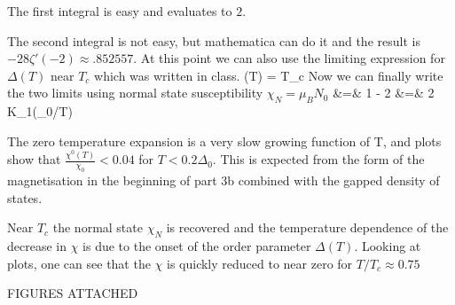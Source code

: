 \documentclass[a4paper,11pt]{article}
\begin{document}
The first integral is easy and evaluates to $2$.

The second integral is not easy, but mathematica can do it and the result is $-28\zeta'(-2)\approx .852557$. At this point we can also use the limiting expression for $\Delta(T)$ near $T_c$  which was written in class.
\be
\Delta(T) = T_c
\ee
Now we can finally write the two limits using normal state susceptibility $\chi_N=\mu_B N_0$
\bea
	 &=& 1 - 2
\eea
\bea
	&=& 2 K_1(\Delta_0/T)
\eea

The zero temperature expansion is a very slow growing function of T, and plots show that $\frac{\chi^{0}(T)}{\chi_0} < 0.04$ for $T<0.2\Delta_0$. This is expected from the form of the magnetisation in the beginning of part 3b combined with the gapped density of states.

Near $T_c$ the normal state $\chi_N$ is recovered and the temperature dependence of the decrease in $\chi$ is due to the onset of the order parameter $\Delta(T)$. Looking at plots, one can see that the $\chi$ is quickly reduced to near zero for $T/T_c \approx 0.75$

FIGURES ATTACHED
\end{document}

